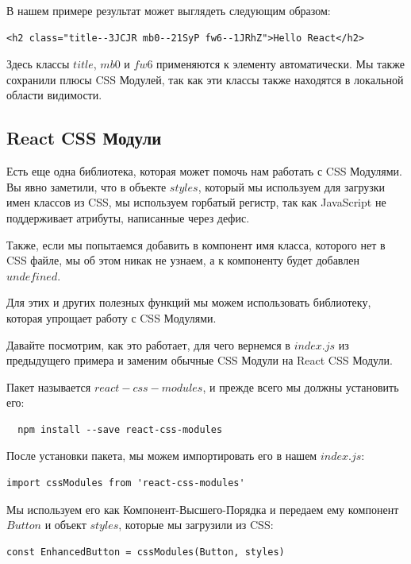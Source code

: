 В нашем примере результат может выглядеть следующим образом:

\begin{lstlisting}
<h2 class="title--3JCJR mb0--21SyP fw6--1JRhZ">Hello React</h2>
\end{lstlisting}

Здесь классы $title$, $mb0$ и $fw6$ применяются к элементу автоматически. Мы также сохранили плюсы CSS Модулей, так как эти классы также находятся в локальной области видимости.

\subsection{React CSS Модули}

Есть еще одна библиотека, которая может помочь нам работать с CSS Модулями. Вы явно заметили, что в объекте $styles$, который мы используем для загрузки имен классов из CSS, мы используем горбатый регистр, так как JavaScript не поддерживает атрибуты, написанные через дефис.

Также, если мы попытаемся добавить в компонент имя класса, которого нет в CSS файле, мы об этом никак не узнаем, а к компоненту будет добавлен $undefined$.

Для этих и других полезных функций мы можем использовать библиотеку, которая упрощает работу с CSS Модулями.

Давайте посмотрим, как это работает, для чего вернемся в $index.js$ из предыдущего примера и заменим обычные CSS Модули на React CSS Модули.

Пакет называется $react-css-modules$, и прежде всего мы должны установить его:

\begin{lstlisting}
  npm install --save react-css-modules
\end{lstlisting}

После установки пакета, мы можем импортировать его в нашем $index.js$:

\begin{lstlisting}
import cssModules from 'react-css-modules'
\end{lstlisting}

Мы используем его как Компонент-Высшего-Порядка и передаем ему компонент $Button$ и объект $styles$, которые мы загрузили из CSS:

\begin{lstlisting}
const EnhancedButton = cssModules(Button, styles)
\end{lstlisting}

